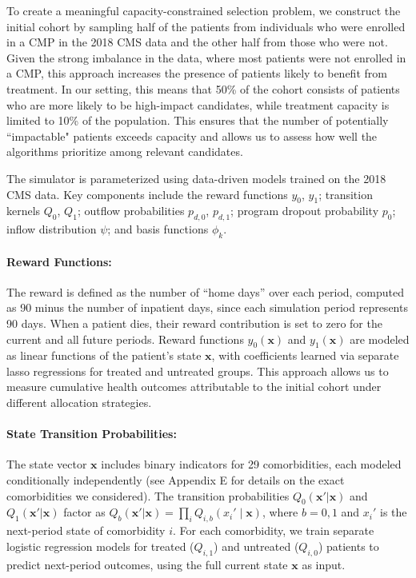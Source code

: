 \documentclass[12pt,a4paper]{article}
\begin{document}
To create a meaningful capacity-constrained selection problem, we construct the initial cohort by sampling half of the patients from individuals who were enrolled in a CMP in the 2018 CMS data and the other half from those who were not. Given the strong imbalance in the data, where most patients were not enrolled in a CMP, this approach increases the presence of patients likely to benefit from treatment. 
In our setting, this means that 50\% of the cohort consists of patients who are more likely to be high-impact candidates, while treatment capacity is limited to 10\% of the population. This ensures that the number of potentially ``impactable" patients exceeds capacity and allows us to assess how well the algorithms prioritize among relevant candidates.


The simulator is parameterized using data-driven models trained on the 2018 CMS data. Key components include the reward functions $y_0$, $y_1$; transition kernels $Q_0$, $Q_1$; outflow probabilities $p_{d,0}$, $p_{d,1}$; program dropout probability $p_0$; inflow distribution $\psi$; and basis functions $\phi_k$.





\paragraph{\bf Reward Functions:}
The reward is defined as the number of “home days” over each period, computed as 90 minus the number of inpatient days, since each simulation period represents 90 days. When a patient dies, their reward contribution is set to zero for the current and all future periods. 
Reward functions $y_0(\mathbf{x})$ and $y_1(\mathbf{x})$ are modeled as linear functions of the patient’s state $\mathbf{x}$, with coefficients learned via separate lasso regressions for treated and untreated groups. This approach allows us to measure cumulative health outcomes attributable to the initial cohort under different allocation strategies.



\paragraph{\bf State Transition Probabilities:}
The state vector \( \mathbf{x} \) includes binary indicators for 29 comorbidities, each modeled conditionally independently (see Appendix E for details on the exact comorbidities we considered). The transition probabilities \( Q_0(\mathbf{x}'|\mathbf{x}) \) and \( Q_1(\mathbf{x}'|\mathbf{x}) \) factor as \( Q_b(\mathbf{x}'|\mathbf{x}) = \prod_i Q_{i,b}(x_i' \mid \mathbf{x}) \), where $b=0,1$ and \( x_i' \) is the next-period state of comorbidity \( i \). For each comorbidity, we train separate logistic regression models for treated (\( Q_{i,1} \)) and untreated (\( Q_{i,0} \)) patients to predict next-period outcomes, using the full current state \( \mathbf{x} \) as input.
\end{document}
